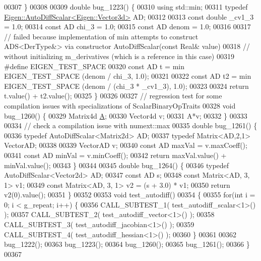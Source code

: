 \begin{DoxyCode}
00307 \}
00308 
00309 \textcolor{keywordtype}{double} bug\_1223() \{
00310   \textcolor{keyword}{using} std::min;
00311   \textcolor{keyword}{typedef} \hyperlink{class_eigen_1_1_auto_diff_scalar}{Eigen::AutoDiffScalar<Eigen::Vector3d>} AD;
00312 
00313   \textcolor{keyword}{const} \textcolor{keywordtype}{double} \_cv1\_3 = 1.0;
00314   \textcolor{keyword}{const} AD chi\_3 = 1.0;
00315   \textcolor{keyword}{const} AD denom = 1.0;
00316 
00317   \textcolor{comment}{// failed because implementation of min attempts to construct ADS<DerType&> via constructor
       AutoDiffScalar(const Real& value)}
00318   \textcolor{comment}{// without initializing m\_derivatives (which is a reference in this case)}
00319 \textcolor{preprocessor}{  #define EIGEN\_TEST\_SPACE}
00320   \textcolor{keyword}{const} AD t = min EIGEN\_TEST\_SPACE (denom / chi\_3, 1.0);
00321 
00322   \textcolor{keyword}{const} AD t2 = min EIGEN\_TEST\_SPACE (denom / (chi\_3 * \_cv1\_3), 1.0);
00323 
00324   \textcolor{keywordflow}{return} t.value() + t2.value();
00325 \}
00326 
00327 \textcolor{comment}{// regression test for some compilation issues with specializations of ScalarBinaryOpTraits}
00328 \textcolor{keywordtype}{void} bug\_1260() \{
00329   Matrix4d \hyperlink{group___core___module_class_eigen_1_1_matrix}{A};
00330   Vector4d v;
00331   A*v;
00332 \}
00333 
00334 \textcolor{comment}{// check a compilation issue with numext::max}
00335 \textcolor{keywordtype}{double} bug\_1261() \{
00336   \textcolor{keyword}{typedef} AutoDiffScalar<Matrix2d> AD;
00337   \textcolor{keyword}{typedef} Matrix<AD,2,1> VectorAD;
00338 
00339   VectorAD v;
00340   \textcolor{keyword}{const} AD maxVal = v.maxCoeff();
00341   \textcolor{keyword}{const} AD minVal = v.minCoeff();
00342   \textcolor{keywordflow}{return} maxVal.value() + minVal.value();
00343 \}
00344 
00345 \textcolor{keywordtype}{double} bug\_1264() \{
00346   \textcolor{keyword}{typedef} AutoDiffScalar<Vector2d> AD;
00347   \textcolor{keyword}{const} AD s;
00348   \textcolor{keyword}{const} Matrix<AD, 3, 1> v1;
00349   \textcolor{keyword}{const} Matrix<AD, 3, 1> v2 = (s + 3.0) * v1;
00350   \textcolor{keywordflow}{return} v2(0).value();
00351 \}
00352 
00353 \textcolor{keywordtype}{void} test\_autodiff()
00354 \{
00355   \textcolor{keywordflow}{for}(\textcolor{keywordtype}{int} i = 0; i < g\_repeat; i++) \{
00356     CALL\_SUBTEST\_1( test\_autodiff\_scalar<1>() );
00357     CALL\_SUBTEST\_2( test\_autodiff\_vector<1>() );
00358     CALL\_SUBTEST\_3( test\_autodiff\_jacobian<1>() );
00359     CALL\_SUBTEST\_4( test\_autodiff\_hessian<1>() );
00360   \}
00361 
00362   bug\_1222();
00363   bug\_1223();
00364   bug\_1260();
00365   bug\_1261();
00366 \}
00367 
\end{DoxyCode}
